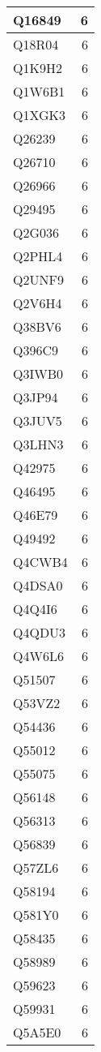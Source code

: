 \documentclass[
]{book}
\theoremstyle{definition}
\theoremstyle{definition}
\theoremstyle{definition}
\theoremstyle{definition}
\theoremstyle{remark}
\begin{document}
\begin{table}
\begin{tabular}{l|r}
\hline
Q16849 & 6\\
\hline
Q18R04 & 6\\
\hline
Q1K9H2 & 6\\
\hline
Q1W6B1 & 6\\
\hline
Q1XGK3 & 6\\
\hline
Q26239 & 6\\
\hline
Q26710 & 6\\
\hline
Q26966 & 6\\
\hline
Q29495 & 6\\
\hline
Q2G036 & 6\\
\hline
Q2PHL4 & 6\\
\hline
Q2UNF9 & 6\\
\hline
Q2V6H4 & 6\\
\hline
Q38BV6 & 6\\
\hline
Q396C9 & 6\\
\hline
Q3IWB0 & 6\\
\hline
Q3JP94 & 6\\
\hline
Q3JUV5 & 6\\
\hline
Q3LHN3 & 6\\
\hline
Q42975 & 6\\
\hline
Q46495 & 6\\
\hline
Q46E79 & 6\\
\hline
Q49492 & 6\\
\hline
Q4CWB4 & 6\\
\hline
Q4DSA0 & 6\\
\hline
Q4Q4I6 & 6\\
\hline
Q4QDU3 & 6\\
\hline
Q4W6L6 & 6\\
\hline
Q51507 & 6\\
\hline
Q53VZ2 & 6\\
\hline
Q54436 & 6\\
\hline
Q55012 & 6\\
\hline
Q55075 & 6\\
\hline
Q56148 & 6\\
\hline
Q56313 & 6\\
\hline
Q56839 & 6\\
\hline
Q57ZL6 & 6\\
\hline
Q58194 & 6\\
\hline
Q581Y0 & 6\\
\hline
Q58435 & 6\\
\hline
Q58989 & 6\\
\hline
Q59623 & 6\\
\hline
Q59931 & 6\\
\hline
Q5A5E0 & 6\\

\end{tabular}
\end{table}
\end{document}
